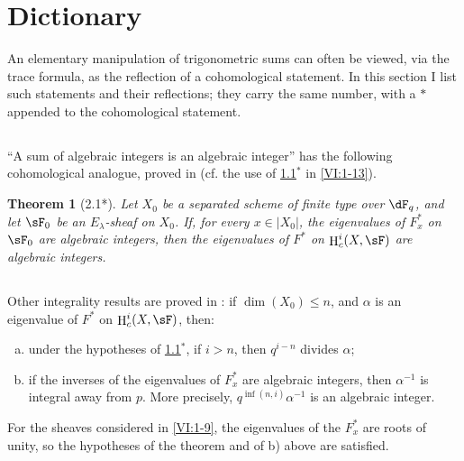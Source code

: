 \documentclass[12pt,oneside,english]{smfbook}
\DeclareMathOperator{\h}{H}
\newtheorem*{theorem*}{Theorem}
\begin{document}
\section{Dictionary}\label{VI:2}

An elementary manipulation of trigonometric sums can often be viewed, via the trace formula, as the reflection of a cohomological statement. In this section I list such statements and their reflections; they carry the same number, with a $\ast$ appended to the cohomological statement.

\subsection{}\label{VI:2-1}

``A sum of algebraic integers is an algebraic integer'' has the following cohomological analogue, proved in \cite[XXI 5.2.2]{sga7} (cf. the use of \ref{VI:2-1}$^\ast$ in \ref{VI:1-13}).

\begin{theorem*}[2.1*]\label{VI:2-1*}
Let $X_0$ be a separated scheme of finite type over $\dF_q$, and let $\sF_0$ be an $E_\lambda$-sheaf on $X_0$. If, for every $x\in|X_0|$, the eigenvalues of $F_x^\ast$ on $\sF_0$ are algebraic integers, then the eigenvalues of $F^\ast$ on $\h_c^i(X,\sF)$ are algebraic integers.
\end{theorem*}

\subsection{}\label{VI:2-2}

Other integrality results are proved in \cite[XXI, 5.2.2 and 5.4]{sga7}: if $\dim(X_0)\leqslant n$, and $\alpha$ is an eigenvalue of $F^\ast$ on $\h_c^i(X,\sF)$, then:
\begin{enumerate}[a)]
  \item under the hypotheses of \ref{VI:2-1}$^\ast$, if $i>n$, then $q^{i-n}$ divides $\alpha$;
  \item if the inverses of the eigenvalues of $F_x^\ast$ are algebraic integers, then $\alpha^{-1}$ is integral away from $p$. More precisely, $q^{\inf(n,i)}\alpha^{-1}$ is an algebraic integer.
\end{enumerate}

For the sheaves considered in \ref{VI:1-9}, the eigenvalues of the $F_x^\ast$ are roots of unity, so the hypotheses of the theorem and of b) above are satisfied.
\end{document}
